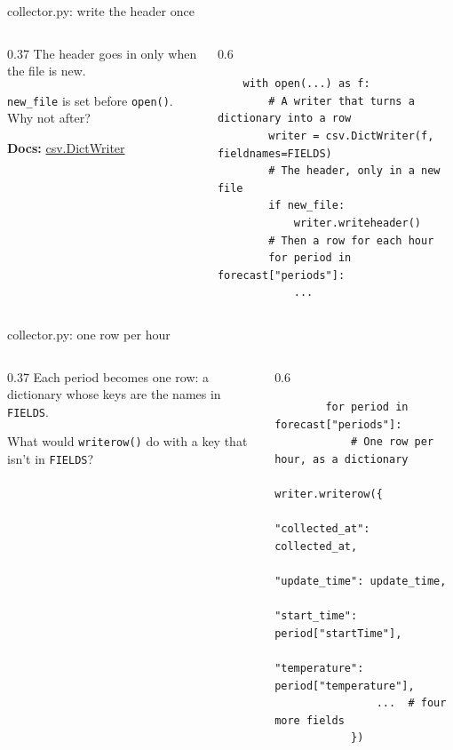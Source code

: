 \documentclass[9pt,aspectratio=169]{beamer}
\begin{document}
\begin{frame}[fragile]{collector.py: write the header once}
    \begin{columns}[T]
        \begin{column}{0.37\textwidth}
            The header goes in only when the file is new.

            \medskip
            \texttt{new\_file} is set before \texttt{open()}. Why not after?

            \medskip
            {\scriptsize\textbf{Docs:} \href{https://docs.python.org/3/library/csv.html\#csv.DictWriter}{csv.DictWriter}\par}
        \end{column}
        \begin{column}{0.6\textwidth}
\begin{lstlisting}
    with open(...) as f:
        # A writer that turns a dictionary into a row
        writer = csv.DictWriter(f, fieldnames=FIELDS)
        # The header, only in a new file
        if new_file:
            writer.writeheader()
        # Then a row for each hour
        for period in forecast["periods"]:
            ...
\end{lstlisting}
        \end{column}
    \end{columns}
\end{frame}

\begin{frame}[fragile]{collector.py: one row per hour}
    \begin{columns}[T]
        \begin{column}{0.37\textwidth}
            Each period becomes one row: a dictionary whose keys are the names in \texttt{FIELDS}.

            \medskip
            What would \texttt{writerow()} do with a key that isn't in \texttt{FIELDS}?
        \end{column}
        \begin{column}{0.6\textwidth}
\begin{lstlisting}
        for period in forecast["periods"]:
            # One row per hour, as a dictionary
            writer.writerow({
                "collected_at": collected_at,
                "update_time": update_time,
                "start_time": period["startTime"],
                "temperature": period["temperature"],
                ...  # four more fields
            })
\end{lstlisting}
        \end{column}
    \end{columns}
\end{frame}
\end{document}
